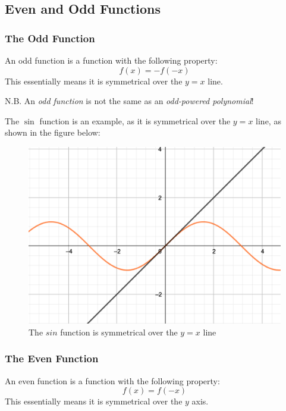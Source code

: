 \documentclass{beamer}
\begin{document}
    \subsection{Even and Odd Functions}
    \begin{frame}
        \frametitle{The Odd Function}
        An odd function is a function with the following property:
        $$f(x)=-f(-x)$$
        This essentially means it is symmetrical over the $y=x$ line.
        \begin{alertblock}{N.B.}
            An \emph{odd function} is not the same as an \emph{odd-powered polynomial}!
        \end{alertblock}
    \end{frame}
    \begin{frame}
        \begin{example}
            The $\sin$ function is an example, as it is symmetrical over the $y=x$ line, as shown in the figure below:
            \begin{figure}
                \caption{The $sin$ function is symmetrical over the $y=x$ line}
                \includegraphics[scale=0.2]{images/sin.png}
            \end{figure}
        \end{example}
    \end{frame}
    \begin{frame}
        \frametitle{The Even Function}
        An even function is a function with the following property:
        $$f(x)=f(-x)$$
        This essentially means it is symmetrical over the $y$ axis.
    \end{frame}
\end{document}
